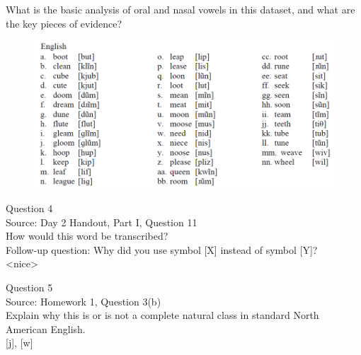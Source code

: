 \documentclass[12pt]{article}
\begin{document}
What is the basic analysis of oral and nasal vowels in this dataset, and what are the key pieces of evidence?\\

\begin{figure}[H]
\includegraphics{../images/english12.png}
\end{figure}

\newpage

{\large Question 4}\\

Source: Day 2 Handout, Part I, Question 11\\

How would this word be transcribed?\\ Follow-up question: Why did you use symbol [X] instead of symbol [Y]?\\

<nice>


\newpage

{\large Question 5}\\

Source: Homework 1, Question 3(b)\\

Explain why this is or is not a complete natural class in standard North American English.\\

{[j]}, {[w]}


\newpage

\begin{center}
\textbf{{\color{red}{\HUGE END OF EXAM}}}\\

\end{center}
\newpage

\begin{center}
\textbf{{\color{blue}{\HUGE START OF EXAM\\}}}

\textbf{{\color{blue}{\HUGE Student ID: 2357\\}}}

\textbf{{\color{blue}{\HUGE 12:30 - 12:45 PM\\}}}

\end{center}
\newpage
\end{document}
